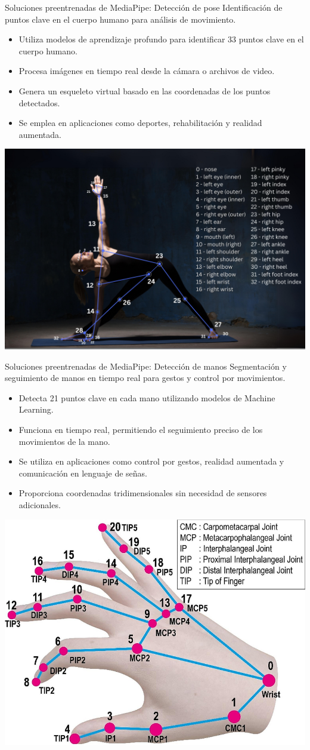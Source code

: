 \begin{frame}{Soluciones preentrenadas de MediaPipe: Detección de pose }
    Identificación de puntos clave en el cuerpo humano para análisis de movimiento.
    \begin{itemize}
        \item Utiliza modelos de aprendizaje profundo para identificar 33 puntos clave en el cuerpo humano.
        \item Procesa imágenes en tiempo real desde la cámara o archivos de video.
        \item Genera un esqueleto virtual basado en las coordenadas de los puntos detectados.
        \item Se emplea en aplicaciones como deportes, rehabilitación y realidad aumentada.
    \end{itemize}    
    \begin{center}
        \includegraphics[width=0.5\linewidth]{01_MediaPipe/pose_landmarks.png}
    \end{center}
\end{frame}

\begin{frame}{Soluciones preentrenadas de MediaPipe: Detección de manos}
    Segmentación y seguimiento de manos en tiempo real para gestos y control por movimientos.
   \begin{itemize}
        \item Detecta 21 puntos clave en cada mano utilizando modelos de Machine Learning.
        \item Funciona en tiempo real, permitiendo el seguimiento preciso de los movimientos de la mano.
        \item Se utiliza en aplicaciones como control por gestos, realidad aumentada y comunicación en lenguaje de señas.
        \item Proporciona coordenadas tridimensionales sin necesidad de sensores adicionales.
    \end{itemize}
    \begin{center}
        \includegraphics[width=0.4\linewidth]{01_MediaPipe/hand_landmarks.png}
    \end{center}
\end{frame}


